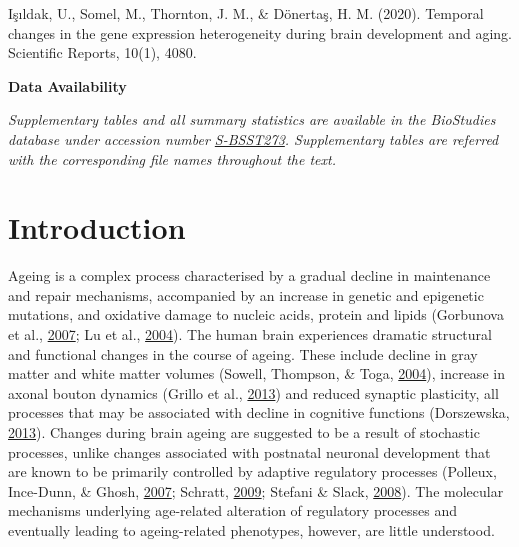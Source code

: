 \documentclass[12pt,twoside]{unicam}
\begin{document}
Işıldak, U., Somel, M., Thornton, J. M., \& Dönertaş, H. M. (2020). Temporal changes in the gene expression heterogeneity during brain development and aging. Scientific Reports, 10(1), 4080.

\textbf{Data Availability}

\emph{Supplementary tables and all summary statistics are available in the BioStudies database under accession number \href{https://www.ebi.ac.uk/biostudies/studies/S-BSST273}{S-BSST273}. Supplementary tables are referred with the corresponding file names throughout the text.}
\normalsize

\hypertarget{introduction-1}{%
\section{Introduction}\label{introduction-1}}

Ageing is a complex process characterised by a gradual decline in maintenance and repair mechanisms, accompanied by an increase in genetic and epigenetic mutations, and oxidative damage to nucleic acids, protein and lipids (Gorbunova et al., \protect\hyperlink{ref-Gorbunova2007}{2007}; Lu et al., \protect\hyperlink{ref-Lu2004}{2004}). The human brain experiences dramatic structural and functional changes in the course of ageing. These include decline in gray matter and white matter volumes (Sowell, Thompson, \& Toga, \protect\hyperlink{ref-Sowell2004}{2004}), increase in axonal bouton dynamics (Grillo et al., \protect\hyperlink{ref-Grillo2013}{2013}) and reduced synaptic plasticity, all processes that may be associated with decline in cognitive functions (Dorszewska, \protect\hyperlink{ref-Dorszewska2013}{2013}). Changes during brain ageing are suggested to be a result of stochastic processes, unlike changes associated with postnatal neuronal development that are known to be primarily controlled by adaptive regulatory processes (Polleux, Ince-Dunn, \& Ghosh, \protect\hyperlink{ref-Polleux2007}{2007}; Schratt, \protect\hyperlink{ref-Schratt2009}{2009}; Stefani \& Slack, \protect\hyperlink{ref-Stefani2008}{2008}). The molecular mechanisms underlying age-related alteration of regulatory processes and eventually leading to ageing-related phenotypes, however, are little understood.
\end{document}
